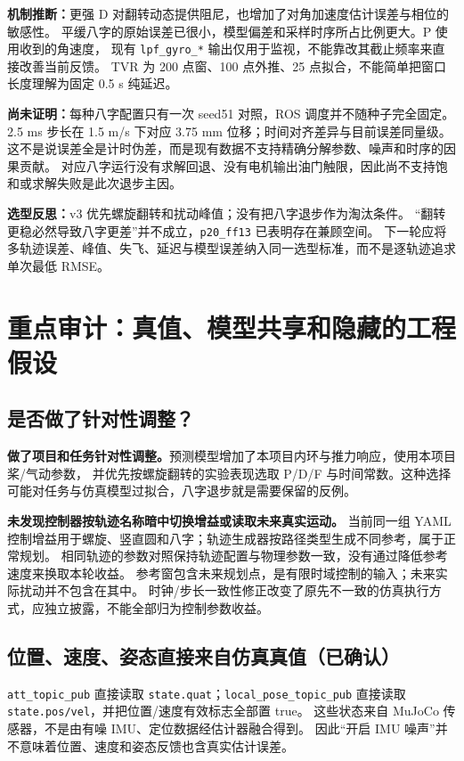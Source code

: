 \documentclass[UTF8,a4paper,11pt,fontset=fandol]{ctexart}
\newcommand{\code}[1]{{\small\nolinkurl{#1}}}
\begin{document}
\textbf{机制推断：}更强 D 对翻转动态提供阻尼，也增加了对角加速度估计误差与相位的敏感性。
平缓八字的原始误差已很小，模型偏差和采样时序所占比例更大。P 使用收到的角速度，
现有 \code{lpf_gyro_*} 输出仅用于监视，不能靠改其截止频率来直接改善当前反馈。
TVR 为 200 点窗、100 点外推、25 点拟合，不能简单把窗口长度理解为固定 0.5 s 纯延迟。

\textbf{尚未证明：}每种八字配置只有一次 seed51 对照，ROS 调度并不随种子完全固定。
2.5 ms 步长在 1.5 m/s 下对应 3.75 mm 位移；时间对齐差异与目前误差同量级。
这不是说误差全是计时伪差，而是现有数据不支持精确分解参数、噪声和时序的因果贡献。
对应八字运行没有求解回退、没有电机输出油门触限，因此尚不支持饱和或求解失败是此次退步主因。

\textbf{选型反思：}v3 优先螺旋翻转和扰动峰值；没有把八字退步作为淘汰条件。
“翻转更稳必然导致八字更差”并不成立，\code{p20_ff13} 已表明存在兼顾空间。
下一轮应将多轨迹误差、峰值、失飞、延迟与模型误差纳入同一选型标准，而不是逐轨迹追求单次最低 RMSE。

\section{重点审计：真值、模型共享和隐藏的工程假设}
\subsection{是否做了针对性调整？}
\textbf{做了项目和任务针对性调整。}预测模型增加了本项目内环与推力响应，使用本项目桨/气动参数，
并优先按螺旋翻转的实验表现选取 P/D/F 与时间常数。这种选择可能对任务与仿真模型过拟合，八字退步就是需要保留的反例。

\textbf{未发现控制器按轨迹名称暗中切换增益或读取未来真实运动。}
当前同一组 YAML 控制增益用于螺旋、竖直圆和八字；轨迹生成器按路径类型生成不同参考，属于正常规划。
相同轨迹的参数对照保持轨迹配置与物理参数一致，没有通过降低参考速度来换取本轮收益。
参考窗包含未来规划点，是有限时域控制的输入；未来实际扰动并不包含在其中。
时钟/步长一致性修正改变了原先不一致的仿真执行方式，应独立披露，不能全部归为控制参数收益。

\subsection{位置、速度、姿态直接来自仿真真值（已确认）}
\code{att_topic_pub} 直接读取 \code{state.quat}；\code{local_pose_topic_pub} 直接读取
\code{state.pos/vel}，并把位置/速度有效标志全部置 true。
这些状态来自 MuJoCo 传感器，不是由有噪 IMU、定位数据经估计器融合得到。
因此“开启 IMU 噪声”并不意味着位置、速度和姿态反馈也含真实估计误差。
\end{document}
